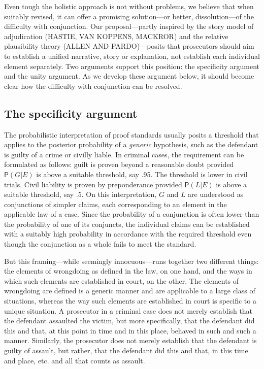 \documentclass[
  10pt,
  dvipsnames,enabledeprecatedfontcommands]{scrartcl}
\newcommand{\pr}[1]{\mathsf{P}(#1)}
\begin{document}
Even tough the holistic approach is not without problems, we believe
that when suitably revised, it can offer a promising solution---or
better, dissolution---of the difficulty with conjunction. Our
proposal---partly inspired by the story model of adjudication (HASTIE,
VAN KOPPENS, MACKROR) and the relative plausibility theory (ALLEN AND
PARDO)---posits that prosecutors should aim to establish a unified
narrative, story or explanation, not establish each individual element
separately. Two arguments support this position: the specificity
argument and the unity argument. As we develop these argument below, it
should become clear how the difficulty with conjunction can be resolved.

\hypertarget{the-specificity-argument}{%
\subsection{The specificity argument}\label{the-specificity-argument}}

The probabilistic interpretation of proof standards usually posits a
threshold that applies to the posterior probability of a \emph{generic}
hypothesis, such as the defendant is guilty of a crime or civilly
liable. In criminal cases, the requirement can be formulated as follows:
guilt is proven beyond a reasonable doubt provided \(\pr{G \vert E}\) is
above a suitable threshold, say .95. The threshold is lower in civil
trials. Civil liability is proven by preponderance provided
\(\pr{L \vert E}\) is above a suitable threshold, say .5. On this
interpretation, \(G\) and \(L\) are understood as conjunctions of
simpler claims, each corresponding to an element in the applicable law
of a case. Since the probability of a conjunction is often lower than
the probability of one of its conjuncts, the individual claims can be
established with a suitably high probability in accordance with the
required threshold even though the conjunction as a whole fails to meet
the standard.

But this framing---while seemingly innocuous---runs together two
different things: the elements of wrongdoing as defined in the law, on
one hand, and the ways in which such elements are established in court,
on the other. The elements of wrongdoing are defined is a generic manner
and are applicable to a large class of situations, whereas the way such
elements are established in court is specific to a unique situation. A
prosecutor in a criminal case does not merely establish that the
defendant assaulted the victim, but more specifically, that the
defendant did this and that, at this point in time and in this place,
behaved in such and such a manner. Similarly, the prosecutor does not
merely establish that the defendant is guilty of assault, but rather,
that the defendant did this and that, in this time and place, etc. and
all that counts as assault.
\end{document}
